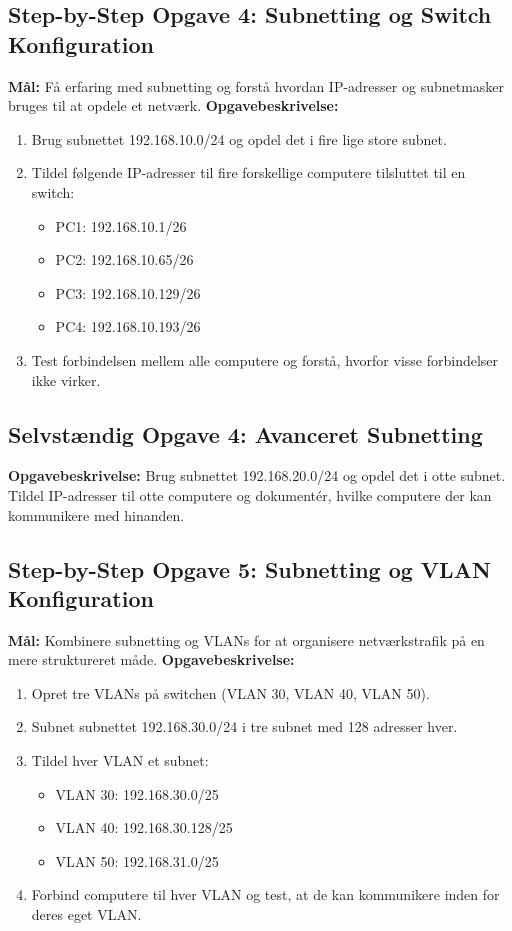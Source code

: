 \subsection*{Step-by-Step Opgave 4: Subnetting og Switch Konfiguration}
\textbf{Mål:} Få erfaring med subnetting og forstå hvordan IP-adresser og subnetmasker bruges til at opdele et netværk.
\newline\newline\noindent
\textbf{Opgavebeskrivelse:}
\begin{enumerate}
	\item Brug subnettet 192.168.10.0/24 og opdel det i fire lige store subnet.
	\item Tildel følgende IP-adresser til fire forskellige computere tilsluttet til en switch:
	\begin{itemize}
		\item PC1: 192.168.10.1/26
		\item PC2: 192.168.10.65/26
		\item PC3: 192.168.10.129/26
		\item PC4: 192.168.10.193/26
	\end{itemize}
	\item Test forbindelsen mellem alle computere og forstå, hvorfor visse forbindelser ikke virker.
\end{enumerate}

\subsection*{Selvstændig Opgave 4: Avanceret Subnetting}
\textbf{Opgavebeskrivelse:} Brug subnettet 192.168.20.0/24 og opdel det i otte subnet. Tildel IP-adresser til otte computere og dokumentér, hvilke computere der kan kommunikere med hinanden.

\subsection*{Step-by-Step Opgave 5: Subnetting og VLAN Konfiguration}
\textbf{Mål:} Kombinere subnetting og VLANs for at organisere netværkstrafik på en mere struktureret måde.
\newline\newline\noindent
\textbf{Opgavebeskrivelse:}
\begin{enumerate}
	\item Opret tre VLANs på switchen (VLAN 30, VLAN 40, VLAN 50).
	\item Subnet subnettet 192.168.30.0/24 i tre subnet med 128 adresser hver.
	\item Tildel hver VLAN et subnet:
	\begin{itemize}
		\item VLAN 30: 192.168.30.0/25
		\item VLAN 40: 192.168.30.128/25
		\item VLAN 50: 192.168.31.0/25
	\end{itemize}
	\item Forbind computere til hver VLAN og test, at de kan kommunikere inden for deres eget VLAN.
\end{enumerate}

